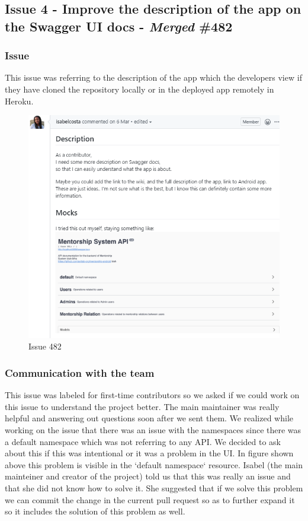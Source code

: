 \documentclass{article}
\begin{document}
\subsection{Issue 4 - Improve the description of the app on the Swagger UI docs - \emph{Merged} \#482}
\subsubsection{Issue}
\hspace{0.5cm}This issue was referring to the description of the app which the developers view if they have cloned the repository locally or in the deployed app remotely in Heroku.
\begin{figure}[tph!]
\centerline{\includegraphics[totalheight=12cm, width=14cm]{issue482.png}}
    \caption{Issue 482}
    \label{fig:verticalcell}
\end{figure}

\vfill
\clearpage
\subsubsection{Communication with the team}										
\hspace{0.5cm}This issue was labeled for first-time contributors so we asked if we could work on this issue to understand the project better. The main maintainer was really helpful and answering out questions soon after we sent them. We realized while working on the issue that there was an issue with the namespaces since there was a default namespace which was not referring to any API. We decided to ask about this if this was intentional or it was a problem in the UI. In figure shown above this problem is visible in the `default namespace` resource. Isabel (the main mainteiner and creator of the project) told us that this was really an issue and that she did not know how to solve it. She suggested that if we solve this problem we can commit the change in the current pull request so as to further expand it so it includes the solution of this problem as well.
\end{document}
